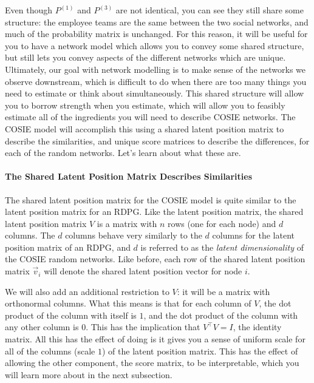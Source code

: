 Even though $P^{(1)}$ and $P^{(3)}$ are not {identical}, you can see they still share {some} structure: the employee teams are the same between the two social networks, and much of the probability matrix is unchanged. For this reason, it will be useful for you to have a network model which allows you to convey {some} shared structure, but still lets you convey aspects of the different networks which are {unique}. Ultimately, our goal with network modelling is to make sense of the networks we observe downstream, which is difficult to do when there are too many things you need to estimate or think about simultaneously. This {shared structure} will allow you to {borrow strength} when you estimate, which will allow you to feasibly estimate all of the ingredients you will need to describe COSIE networks. The COSIE model will accomplish this using a {shared latent position matrix} to describe the {similarities}, and unique {score matrices} to describe the {differences}, for each of the random networks. Let's learn about what these are.

\paragraph{The Shared Latent Position Matrix Describes Similarities}
\label{sec:ch5:multi:cosie:slpm}

The {shared latent position matrix} for the COSIE model is quite similar to the latent position matrix for an RDPG. Like the latent position matrix, the shared latent position matrix $V$ is a matrix with $n$ rows (one for each node) and $d$ columns. The $d$ columns behave very similarly to the $d$ columns for the latent position matrix of an RDPG, and $d$ is referred to as the \textit{latent dimensionality} of the COSIE random networks. Like before, each row of the shared latent position matrix $\vec v_i$ will denote the shared latent position vector for node $i$.

We will also add an additional restriction to $V$: it will be a matrix with orthonormal columns. What this means is that for each column of $V$, the dot product of the column with itself is $1$, and the dot product of the column with any other column is $0$. This has the implication that $V^\top V = I$, the identity matrix. All this has the effect of doing is it gives you a sense of uniform scale for all of the columns (scale $1$) of the latent position matrix. This has the effect of allowing the other component, the {score matrix}, to be interpretable, which you will learn more about in the next subsection.  

